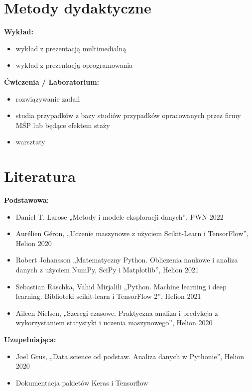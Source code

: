 \documentclass[12pt, a4paper]{article}
\begin{document}
\section{Metody dydaktyczne}

\textbf{Wykład:}
\begin{itemize}
  \item wykład z prezentacją multimedialną
  \item wykład z prezentacją oprogramowania
\end{itemize}
\vspace{4pt}
\textbf{Ćwiczenia / Laboratorium:}
\begin{itemize}
  \item rozwiązywanie zadań
  \item studia przypadków z bazy studiów przypadków opracowanych przez firmy MŚP lub będące efektem staży
  \item warsztaty
\end{itemize}
\vspace{4pt}


\section{Literatura}

\textbf{Podstawowa:}
\begin{itemize}
  \item Daniel T. Larose „Metody i modele eksploracji danych”, PWN 2022
  \item Aurélien Géron, „Uczenie maszynowe z użyciem Scikit-Learn i TensorFlow”, Helion 2020
  \item Robert Johansson „Matematyczny Python. Obliczenia naukowe i analiza danych z użyciem NumPy, SciPy i Matplotlib”, Helion 2021
  \item Sebastian Raschka, Vahid Mirjalili „Python. Machine learning i deep learning. Biblioteki scikit-learn i TensorFlow 2”, Helion 2021
  \item Aileen Nielsen, „Szeregi czasowe. Praktyczna analiza i predykcja z wykorzystaniem statystyki i uczenia maszynowego”, Helion 2020
\end{itemize}

\textbf{Uzupełniająca:}
\begin{itemize}
  \item Joel Grus, „Data science od podstaw. Analiza danych w Pythonie”, Helion 2020
  \item Dokumentacja pakietów Keras i Tensorflow
\end{itemize}
\end{document}
